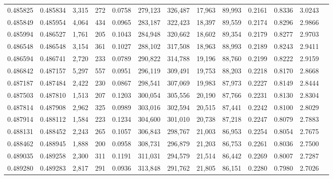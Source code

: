\begin{tabular}{rrrrrrrrrrrrr}
0.485825 & 0.485834 &  3,315 &   272 &                                     0.0758 & 279,123 & 326,487 &  17,963 &  89,993 & 0.2161 & 0.8336 & 3.0243 \\
0.485849 & 0.485954 &  4,064 &   434 &                                     0.0965 & 283,187 & 322,423 &  18,397 &  89,559 & 0.2174 & 0.8296 & 2.9866 \\
0.485994 & 0.486527 &  1,761 &   205 &                                     0.1043 & 284,948 & 320,662 &  18,602 &  89,354 & 0.2179 & 0.8277 & 2.9703 \\
0.486548 & 0.486548 &  3,154 &   361 &                                     0.1027 & 288,102 & 317,508 &  18,963 &  88,993 & 0.2189 & 0.8243 & 2.9411 \\
0.486594 & 0.486741 &  2,720 &   233 &                                     0.0789 & 290,822 & 314,788 &  19,196 &  88,760 & 0.2199 & 0.8222 & 2.9159 \\
0.486842 & 0.487157 &  5,297 &   557 &                                     0.0951 & 296,119 & 309,491 &  19,753 &  88,203 & 0.2218 & 0.8170 & 2.8668 \\
0.487187 & 0.487484 &  2,422 &   230 &                                     0.0867 & 298,541 & 307,069 &  19,983 &  87,973 & 0.2227 & 0.8149 & 2.8444 \\
0.487503 & 0.487810 &  1,513 &   207 &                                     0.1203 & 300,054 & 305,556 &  20,190 &  87,766 & 0.2231 & 0.8130 & 2.8304 \\
0.487814 & 0.487908 &  2,962 &   325 &                                     0.0989 & 303,016 & 302,594 &  20,515 &  87,441 & 0.2242 & 0.8100 & 2.8029 \\
0.487914 & 0.488112 &  1,584 &   223 &                                     0.1234 & 304,600 & 301,010 &  20,738 &  87,218 & 0.2247 & 0.8079 & 2.7883 \\
0.488131 & 0.488452 &  2,243 &   265 &                                     0.1057 & 306,843 & 298,767 &  21,003 &  86,953 & 0.2254 & 0.8054 & 2.7675 \\
0.488462 & 0.488945 &  1,888 &   200 &                                     0.0958 & 308,731 & 296,879 &  21,203 &  86,753 & 0.2261 & 0.8036 & 2.7500 \\
0.489035 & 0.489258 &  2,300 &   311 &                                     0.1191 & 311,031 & 294,579 &  21,514 &  86,442 & 0.2269 & 0.8007 & 2.7287 \\
0.489280 & 0.489283 &  2,817 &   291 &                                     0.0936 & 313,848 & 291,762 &  21,805 &  86,151 & 0.2280 & 0.7980 & 2.7026 \\

\end{tabular}
